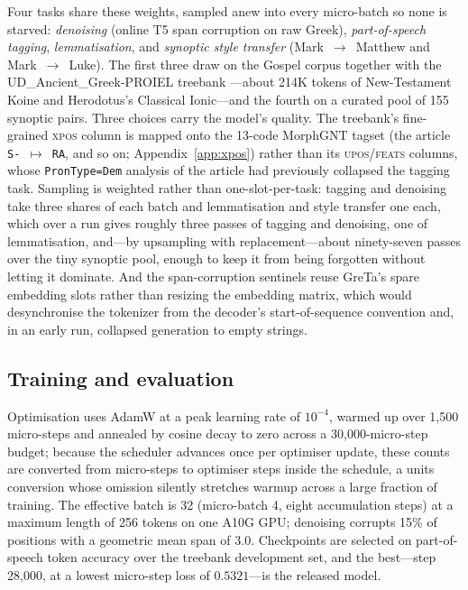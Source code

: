 \documentclass[11pt,letterpaper]{article}
\begin{document}
Four tasks share these weights, sampled anew into every micro-batch so none is starved: \emph{denoising} (online T5 span corruption on raw Greek), \emph{part-of-speech tagging}, \emph{lemmatisation}, and \emph{synoptic style transfer} (Mark~$\to$~Matthew and Mark~$\to$~Luke). The first three draw on the Gospel corpus together with the \mbox{UD\_Ancient\_Greek-PROIEL} treebank \citep{haug2008}---about 214K tokens of New-Testament Koine and Herodotus's Classical Ionic---and the fourth on a curated pool of 155 synoptic pairs. Three choices carry the model's quality. The treebank's fine-grained \textsc{xpos} column is mapped onto the 13-code MorphGNT tagset (the article \texttt{S-}~$\mapsto$~\texttt{RA}, and so on; Appendix~\ref{app:xpos}) rather than its \textsc{upos}/\textsc{feats} columns, whose \texttt{PronType=Dem} analysis of the article had previously collapsed the tagging task. Sampling is weighted rather than one-slot-per-task: tagging and denoising take three shares of each batch and lemmatisation and style transfer one each, which over a run gives roughly three passes of tagging and denoising, one of lemmatisation, and---by upsampling with replacement---about ninety-seven passes over the tiny synoptic pool, enough to keep it from being forgotten without letting it dominate. And the span-corruption sentinels reuse GreTa's spare embedding slots rather than resizing the embedding matrix, which would desynchronise the tokenizer from the decoder's start-of-sequence convention and, in an early run, collapsed generation to empty strings.

\subsection{Training and evaluation}

Optimisation uses AdamW at a peak learning rate of $10^{-4}$, warmed up over 1{,}500 micro-steps and annealed by cosine decay to zero across a 30{,}000-micro-step budget; because the scheduler advances once per optimiser update, these counts are converted from micro-steps to optimiser steps inside the schedule, a units conversion whose omission silently stretches warmup across a large fraction of training. The effective batch is 32 (micro-batch 4, eight accumulation steps) at a maximum length of 256 tokens on one A10G GPU; denoising corrupts 15\% of positions with a geometric mean span of 3.0. Checkpoints are selected on part-of-speech token accuracy over the treebank development set, and the best---step 28{,}000, at a lowest micro-step loss of $0.5321$---is the released model.
\end{document}
